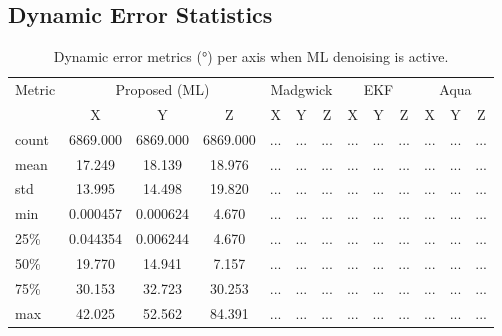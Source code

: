 \documentclass{iutbscthesis}
\begin{document}
\subsection{Dynamic Error Statistics}
\begin{table}[H]
\centering
\caption{Dynamic error metrics (°) per axis when ML denoising is active.}
\label{tab:dynamic_ml}
\begin{tabular}{l
  *{4}{ccc}
}
\toprule
Metric & \multicolumn{3}{c}{Proposed (ML)} & \multicolumn{3}{c}{Madgwick} & \multicolumn{3}{c}{EKF} & \multicolumn{3}{c}{Aqua} \\
 & X & Y & Z & X & Y & Z & X & Y & Z & X & Y & Z \\
\midrule
count & 6869.000 & 6869.000 & 6869.000 & ... & ... & ... & ... & ... & ... & ... & ... & ... \\
mean & 17.249 & 18.139 & 18.976 & ... & ... & ... & ... & ... & ... & ... & ... & ... \\
std & 13.995 & 14.498 & 19.820 & ... & ... & ... & ... & ... & ... & ... & ... & ... \\
min & 0.000457 & 0.000624 & 4.670 & ... & ... & ... & ... & ... & ... & ... & ... & ... \\
25\% & 0.044354 & 0.006244 & 4.670 & ... & ... & ... & ... & ... & ... & ... & ... & ... \\
50\% & 19.770 & 14.941 & 7.157 & ... & ... & ... & ... & ... & ... & ... & ... & ... \\
75\% & 30.153 & 32.723 & 30.253 & ... & ... & ... & ... & ... & ... & ... & ... & ... \\
max & 42.025 & 52.562 & 84.391 & ... & ... & ... & ... & ... & ... & ... & ... & ... \\
\bottomrule
\end{tabular}
\end{table}
\end{document}
